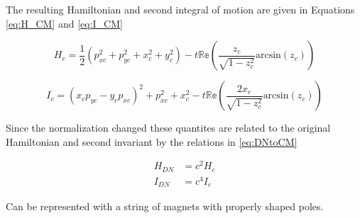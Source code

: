 The resulting Hamiltonian and second integral of motion are given in Equations \ref{eq:H_CM} and \ref{eq:I_CM}

\begin{equation} \label{eq:H_CM}
H_c = \frac{1}{2}\left( p_{xc}^2 + p_{yc}^2 + x_c^2 + y_c^2 \right) - t \mathbb{Re}\left(\frac{z_c}{\sqrt{1-z_c^2}}\textrm{arcsin}(z_c)\right)
\end{equation}

\begin{equation} \label{eq:I_CM}
I_c = (x_c p_{yc} - y_c p_{xc})^2 + p_{xc}^2 + x_c^2 - t\mathbb{Re}\left(\frac{2 x_c}{\sqrt{1-z_c^2}}\textrm{arcsin}(z_c)\right)
\end{equation}

Since the normalization changed these quantites are related to the original Hamiltonian and second invariant by the relations in \ref{eq:DNtoCM}

\begin{equation} \label{eq:DNtoCM}
\begin{split}
	H_{DN} &= c^2 H_c \\
	I_{DN} &= c^4 I_c
\end{split}
\end{equation}



Can be represented with a string of magnets with properly shaped poles.


\cite{danilov_nonlinear_2010}
